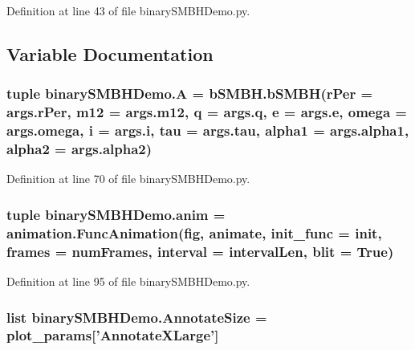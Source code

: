 Definition at line 43 of file binary\-S\-M\-B\-H\-Demo.\-py.



\subsection{Variable Documentation}
\hypertarget{namespacebinary_s_m_b_h_demo_a701565d4b7826c9a6c79feb760267d69}{
\subsubsection[{A}]{\setlength{\rightskip}{0pt plus 5cm}tuple binary\-S\-M\-B\-H\-Demo.\-A = b\-S\-M\-B\-H.\-b\-S\-M\-B\-H(r\-Per = args.\-r\-Per, m12 = args.\-m12, q = args.\-q, {\bf e} = {\bf args.\-e}, omega = args.\-omega, i = args.\-i, tau = args.\-tau, alpha1 = args.\-alpha1, alpha2 = args.\-alpha2)}}\label{namespacebinary_s_m_b_h_demo_a701565d4b7826c9a6c79feb760267d69}


Definition at line 70 of file binary\-S\-M\-B\-H\-Demo.\-py.

\hypertarget{namespacebinary_s_m_b_h_demo_af404de73f4c2e94eb4a0a3253e350e56}{
\subsubsection[{anim}]{\setlength{\rightskip}{0pt plus 5cm}tuple binary\-S\-M\-B\-H\-Demo.\-anim = animation.\-Func\-Animation({\bf fig}, {\bf animate}, init\-\_\-func = {\bf init}, frames = {\bf num\-Frames}, interval = {\bf interval\-Len}, blit = True)}}\label{namespacebinary_s_m_b_h_demo_af404de73f4c2e94eb4a0a3253e350e56}


Definition at line 95 of file binary\-S\-M\-B\-H\-Demo.\-py.

\hypertarget{namespacebinary_s_m_b_h_demo_a3ab3ad088d56421712dc63fcecbbd080}{
\subsubsection[{Annotate\-Size}]{\setlength{\rightskip}{0pt plus 5cm}list binary\-S\-M\-B\-H\-Demo.\-Annotate\-Size = plot\-\_\-params\mbox{[}'Annotate\-X\-Large'\mbox{]}}}\label{namespacebinary_s_m_b_h_demo_a3ab3ad088d56421712dc63fcecbbd080}


